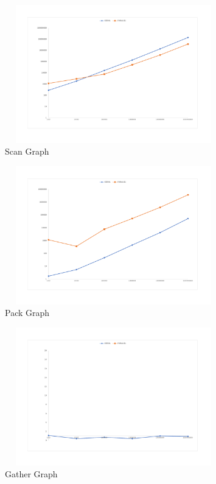 \documentclass[10pt,journal,compsoc]{IEEEtran}
\begin{document}
\begin{figure}[H]
\hspace*{-0.24in}
\includegraphics[height=6cm,width=9.44cm]{jpeg/scan-graph.pdf}
\caption{Scan Graph}
\label{figura:scan}
\end{figure}

\begin{figure}[H]
\hspace*{-0.24in}
\includegraphics[height=6cm,width=9.44cm]{jpeg/pack-graph.pdf}
\caption{Pack Graph}
\label{figura:pack}
\end{figure}

\begin{figure}[H]
\hspace*{-0.24in}
\includegraphics[height=6cm,width=9.44cm]{jpeg/gather-graph(problem).pdf}
\caption{Gather Graph}
\label{figura:gather}
\end{figure}
\end{document}
